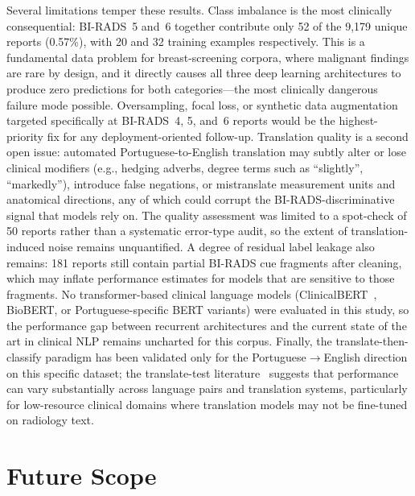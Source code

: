 \documentclass[11pt,a4paper]{article}
\begin{document}
Several limitations temper these results.
Class imbalance is the most clinically consequential: BI-RADS~5 and~6 together
contribute only 52 of the 9{,}179 unique reports (0.57\%), with 20 and 32
training examples respectively.
This is a fundamental data problem for breast-screening corpora, where
malignant findings are rare by design, and it directly causes all three deep
learning architectures to produce zero predictions for both categories---the
most clinically dangerous failure mode possible.
Oversampling, focal loss, or synthetic data augmentation targeted specifically
at BI-RADS~4, 5, and~6 reports would be the highest-priority fix for any
deployment-oriented follow-up.
Translation quality is a second open issue: automated Portuguese-to-English
translation may subtly alter or lose clinical modifiers (e.g., hedging adverbs,
degree terms such as ``slightly'', ``markedly''), introduce false negations, or
mistranslate measurement units and anatomical directions, any of which could
corrupt the BI-RADS-discriminative signal that models rely on.
The quality assessment was limited to a spot-check of 50 reports rather than a
systematic error-type audit, so the extent of translation-induced noise remains
unquantified.
A degree of residual label leakage also remains: 181 reports still contain
partial BI-RADS cue fragments after cleaning, which may inflate performance
estimates for models that are sensitive to those fragments.
No transformer-based clinical language models (ClinicalBERT~\cite{alsentzer2019publicly},
BioBERT, or Portuguese-specific BERT variants) were evaluated in this study,
so the performance gap between recurrent architectures and the current state
of the art in clinical NLP remains uncharted for this corpus.
Finally, the translate-then-classify paradigm has been validated only for the
Portuguese$\to$English direction on this specific dataset; the
translate-test literature~\cite{artetxe2023revisiting,papaioannou2022cross}
suggests that performance can vary substantially across language pairs and
translation systems, particularly for low-resource clinical domains where
translation models may not be fine-tuned on radiology text.

\section{Future Scope}
\end{document}
